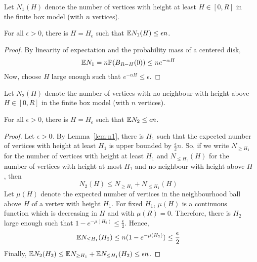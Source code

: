 \begin{lemma}\label{lem:n1}
Let $N_1(H)$ denote the number of vertices with height at least $H \in [0,R]$ in the finite box model (with $n$ vertices).

For all $\epsilon >0$, there is $H=H_\epsilon$ such that $\mathbb{E} N_1(H) \leq \epsilon n$.
\end{lemma}
\begin{proof}
By linearity of expectation and the probability mass of a centered disk,
\begin{align*}
\mathbb{E} N_1 = n \mathbb{P}(B_{R-H}(0)) \leq n e^{-\alpha H}
\end{align*}
Now, choose $H$ large enough such that $e^{-\alpha H} \leq \epsilon$.
\end{proof}
\begin{lemma}
Let $N_2(H)$ denote the number of vertices with no neighbour with height above $H \in [0,R]$ in the finite box model (with $n$ vertices).

For all $\epsilon >0$, there is $H=H_\epsilon$ such that $\mathbb{E} N_2 \leq \epsilon n$.
\end{lemma}
\begin{proof}
Let $\epsilon >0$. By Lemma~\ref{lem:n1}, there is $H_1$ such that the expected number of vertices with height at least $H_1$ is upper bounded by $\frac{\epsilon}{2}n$. So, if we write $N_{\geq H_1}$ for the number of vertices with height at least $H_1$ and $N_{\leq H_1}(H)$ for the number of vertices with height at most $H_1$ and no neighbour with height above $H$, then 
$$N_2(H) \leq N_{\geq H_1} + N_{\leq H_1}(H)$$
Let $\mu(H)$ denote the expected number of vertices in the neighbourhood ball above $H$ of a vertex with height $H_1$. For fixed $H_1$, $\mu(H)$ is a continuous function which is decreasing in $H$ and with $\mu(R)=0$. Therefore, there is $H_2$ large enough such that $1-e^{-\mu(H_2)} \leq \frac{\epsilon}{2}$. Hence,
$$\mathbb{E} N_{\leq H_1}(H_2) \leq n (1-e^{-\mu(H_2)}) \leq \frac{\epsilon}{2}$$
Finally, $\mathbb{E} N_2(H_2) \leq \mathbb{E} N_{\geq H_1} + \mathbb{E} N_{\leq H_1}(H_2) \leq \epsilon n$.
\end{proof}

